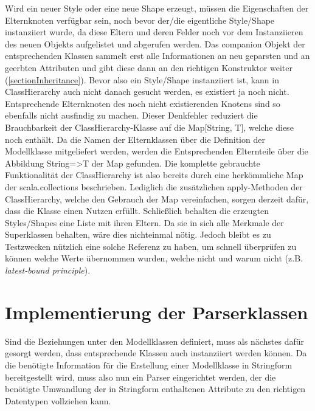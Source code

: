 Wird ein neuer Style oder eine neue Shape erzeugt, müssen die Eigenschaften der Elternknoten verfügbar sein, noch bevor der/die eigentliche Style/Shape instanziiert wurde, da diese Eltern und deren Felder noch vor dem Instanziieren des neuen Objekts aufgelistet und abgerufen werden. Das companion Objekt der entsprechenden Klassen sammelt erst alle Informationen an neu geparsten und an geerbten Attributen und gibt diese dann an den richtigen Konstruktor weiter (\ref{sectionInheritance}). Bevor also ein Style/Shape instanziiert ist, kann in ClassHierarchy auch nicht danach gesucht werden, es existiert ja noch nicht. Entsprechende Elternknoten des noch nicht existierenden Knotens sind so ebenfalls nicht ausfindig zu machen. Dieser Denkfehler reduziert die Brauchbarkeit der ClassHierarchy-Klasse auf die Map[String, T], welche diese noch enthält. Da die Namen der Elternklassen über die Definition der Modellklasse mitgeliefert werden, werden die Entsprechenden Elternteile über die Abbildung String=\textgreater T der Map gefunden.
Die komplette gebrauchte Funktionalität der ClassHierarchy ist also bereits durch eine herkömmliche Map der scala.collections beschrieben. Lediglich die zusätzlichen apply-Methoden der ClassHierarchy, welche den Gebrauch der Map vereinfachen, sorgen derzeit dafür, dass die Klasse einen Nutzen erfüllt. Schließlich behalten die erzeugten Styles/Shapes eine Liste mit ihren Eltern. Da sie in sich alle Merkmale der Superklassen behalten, wäre dies nichteinmal nötig. Jedoch bleibt es zu Testzwecken nützlich eine solche Referenz zu haben, um schnell überprüfen zu können welche Werte übernommen wurden, welche nicht und warum nicht (z.B. \textit{latest-bound principle}).
\section{Implementierung der Parserklassen}
Sind die Beziehungen unter den Modellklassen definiert, muss als nächstes dafür gesorgt werden, dass entsprechende Klassen auch instanziiert werden können. Da die benötigte Information für die Erstellung einer Modellklasse in Stringform bereitgestellt wird, muss also nun ein Parser eingerichtet werden, der die benötigte Umwandlung der in Stringform enthaltenen Attribute zu den richtigen Datentypen vollziehen kann.
